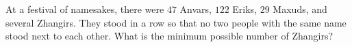 At a festival of namesakes, there were $47$ Anvars, $122$ Eriks, $29$ Maxuds, and several Zhangirs. They stood in a row so that no two people with the same name stood next to each other. What is the minimum possible number of Zhangirs?
